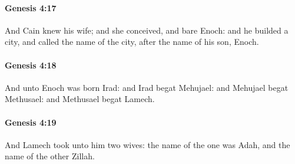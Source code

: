 		\paragraph{Genesis 4:17} %
			\label{GENESIS-4-17}

			And Cain knew his wife; and she conceived, and bare Enoch: and he builded a city, and called the name of the city, after the name of his son, Enoch.


		\paragraph{Genesis 4:18} %
			\label{GENESIS-4-18}

			And unto Enoch was born Irad: and Irad begat Mehujael: and Mehujael begat Methusael: and Methusael begat Lamech.


		\paragraph{Genesis 4:19} %
			\label{GENESIS-4-19}

			And Lamech took unto him two wives: the name of the one was Adah, and the name of the other Zillah.


